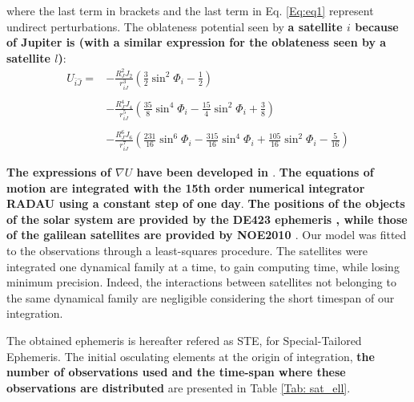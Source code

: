 \documentclass[useAMS,usenatbib]{mn2e}
\begin{document}
where the last term in brackets and the last term in Eq. \ref{Eq:eq1} represent undirect perturbations. The oblateness potential seen by \textbf{a satellite $i$ because of Jupiter is (with a similar expression for the oblateness seen by a satellite $l$)}:
\begin{equation}\begin{array}{ll}

U_{\bar{i}\hat{J}}=&\displaystyle -\frac{R_J^2 J_2}{r_{iJ}^3}\left(\frac{3}{2}\sin^2 \Phi_i-\frac{1}{2}\right)\\ &\\ &
\displaystyle-\frac{R_J^4 J_4}{r_{iJ}^5}\left(\frac{35}{8}\sin^4 \Phi_i-\frac{15}{4}\sin^2 \Phi_i+\frac{3}{8}\right)\\
& \\
&\displaystyle-\frac{R_J^6 J_6}{r_{iJ}^7}\left(\frac{231}{16}\sin^6 \Phi_i-\frac{315}{16}\sin^4 \Phi_i+\frac{105}{16}\sin^2 \Phi_i-\frac{5}{16}\right)

\end{array}
\end{equation}

\textbf{The expressions of $\nabla U$ have been developed in \cite{Lainey2004}}. \textbf{The equations of motion are integrated with the 15th order numerical integrator RADAU \citep{Everhart1985} using a constant step of one day}. \textbf{The positions of the objects of the solar system are provided by the DE423 ephemeris \citep{Folkner2010}, while those of the galilean satellites are provided by NOE2010 \citep{Lainey2004}}.
Our model was fitted to the observations through a least-squares procedure. The satellites were integrated one dynamical family at a time, to gain computing time, while losing minimum precision. Indeed, the interactions between satellites not belonging to the same dynamical family are negligible considering the short timespan of our integration. 

The obtained ephemeris is hereafter refered as STE, for Special-Tailored Ephemeris. The initial osculating elements at the origin of integration, \textbf{the number of observations used and the time-span where these observations are distributed} are presented in Table \ref{Tab: sat_ell}.
\end{document}
